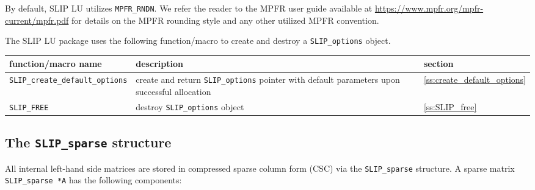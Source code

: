 \documentclass[11pt]{article}
\theoremstyle{definition}
\begin{document}
\begin{itemize}
\noindent By default, SLIP LU utilizes \verb|MPFR_RNDN|. We refer the reader to
the MPFR user guide available at
\url{https://www.mpfr.org/mpfr-current/mpfr.pdf} for details on the MPFR
rounding style and any other utilized MPFR convention.

\end{itemize}

The SLIP LU package uses the following function/macro to create and destroy a
\verb|SLIP_options| object.

\begin{center}
\begin{tabular}{lp{3in}l}
\hline
function/macro name & description & section \\
\hline
\verb|SLIP_create_default_options|
    & create and return \verb|SLIP_options| pointer
      with default parameters upon successful allocation
    & \ref{ss:create_default_options} \\
\hline
\verb|SLIP_FREE|
    & destroy \verb|SLIP_options| object
    & \ref{ss:SLIP_free} \\
\hline
\end{tabular}
\end{center}

\cprotect\subsection{The \verb|SLIP_sparse| structure}
\label{ss:SLIP_sparse}

All internal left-hand side matrices are stored in compressed sparse column
form (CSC) via the \verb|SLIP_sparse| structure. A sparse matrix
\verb|SLIP_sparse *A| has the following components:
\end{document}
